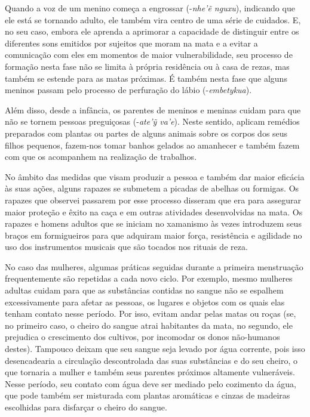 Quando a voz de um menino começa a engrossar
(-\emph{nhe'ẽ nguxu}), indicando que ele está se
tornando adulto, ele também vira centro de uma série de cuidados. E, no
seu caso, embora ele aprenda a aprimorar a capacidade de distinguir
entre os diferentes sons emitidos por sujeitos que moram na mata e a
evitar a comunicação com eles em momentos de maior vulnerabilidade, seu
processo de formação nesta fase não se limita à própria residência ou à
casa de rezas, mas também se estende para as matas próximas. É também
nesta fase que alguns meninos passam pelo processo de perfuração do
lábio (-\emph{embetykua}). 

Além disso, desde a infância, os parentes de meninos e meninas cuidam
para que não se tornem pessoas preguiçosas (-\emph{ate’ỹ va’e}). Neste
sentido, aplicam remédios preparados com plantas ou partes de alguns
animais sobre os corpos dos seus filhos pequenos, fazem-nos tomar
banhos gelados ao amanhecer e também fazem com que os acompanhem na
realização de trabalhos.

No âmbito das medidas que visam produzir a pessoa e também dar maior
eficácia às suas ações, alguns rapazes se submetem a picadas de abelhas
ou formigas. Os rapazes que observei passarem por esse processo
disseram que era para assegurar maior proteção e êxito na caça e em
outras atividades desenvolvidas na mata. Os rapazes e homens adultos
que se iniciam no xamanismo às vezes introduzem seus braços em
formigueiros para que adquiram maior força, resistência e agilidade no
uso dos instrumentos musicais que são tocados nos rituais de reza. 

No caso das mulheres, algumas práticas seguidas durante a primeira
menstruação frequentemente são repetidas a cada novo ciclo. Por
exemplo, mesmo mulheres adultas cuidam para que as substâncias contidas
no sangue não se espalhem excessivamente para afetar as pessoas, os
lugares e objetos com os quais elas tenham contato nesse período. Por
isso, evitam andar pelas matas ou roças (se, no primeiro caso, o cheiro
do sangue atrai habitantes da mata, no segundo, ele prejudica o
crescimento dos cultivos, por incomodar os donos não-humanos destes).
Tampouco deixam que seu sangue seja levado por água corrente, pois isso
desencadearia a circulação descontrolada das suas substâncias e do seu
cheiro, o que tornaria a mulher e também seus parentes próximos
altamente vulneráveis. Nesse período, seu contato com água deve ser
mediado pelo cozimento da água, que pode também ser misturada com
plantas aromáticas e cinzas de madeiras escolhidas para disfarçar o
cheiro do sangue.

